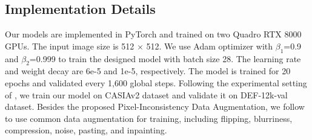 \documentclass[10pt,journal,compsoc]{IEEEtran}
\begin{document}

\subsection{Implementation Details} 
Our models are implemented in PyTorch \cite{paszke2019pytorch} and trained on two Quadro RTX 8000 GPUs. The input image size is 512 $\times$ 512. We use Adam optimizer \cite{kingma2014adam} with $\beta_{1}$=0.9 and $\beta_{2}$=0.999 to train the designed model with batch size 28. The learning rate and weight decay are 6e-5 and 1e-5, respectively. The model is trained for 20 epochs and validated every 1,600 global steps. Following the experimental setting of \cite{dong2022mvss}, we train our model on CASIAv2 \cite{Dong2013} dataset and validate it on DEF-12k-val \cite{mahfoudi2019defacto} dataset. Besides the proposed Pixel-Inconsistency Data Augmentation, we follow \cite{dong2022mvss} to use common data augmentation for training, including flipping, blurriness, compression, noise, pasting, and inpainting. 
\end{document}
